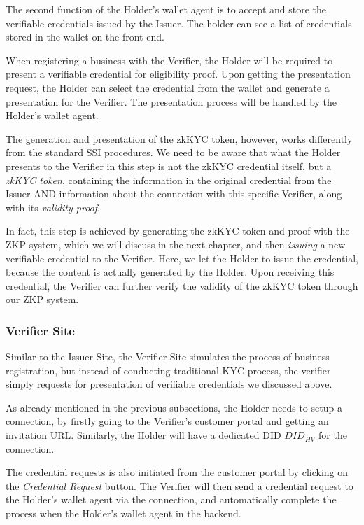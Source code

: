 \documentclass[
]{report}
\begin{document}
The second function of the Holder's wallet agent is to accept and store the
verifiable credentials issued by the Issuer. The holder can see a list of
credentials stored in the wallet on the front-end.

When registering a business with the Verifier, the Holder will be required
to present a verifiable credential for eligibility proof. Upon getting the
presentation request, the Holder can select the credential from the wallet
and generate a presentation for the Verifier. The presentation process will
be handled by the Holder's wallet agent.

The generation and presentation of the zkKYC token, however, works
differently from the standard SSI procedures. We need to be aware that
what the Holder presents to the Verifier in this step is not the zkKYC
credential itself, but a \emph{zkKYC token}, containing the information in
the original credential from the Issuer AND information about the connection
with this specific Verifier, along with its \emph{validity proof}.

In fact, this step is achieved by generating the zkKYC token and proof
with the ZKP system, which we will discuss in the next chapter, and then
\emph{issuing} a new verifiable credential to the Verifier. Here, we let
the Holder to issue the credential, because the content is actually
generated by the Holder. Upon receiving this credential, the Verifier
can further verify the validity of the zkKYC token through our ZKP system.

\subsubsection{Verifier Site}
Similar to the Issuer Site, the Verifier Site simulates the process of
business registration, but instead of conducting traditional KYC process,
the verifier simply requests for presentation of verifiable credentials
we discussed above.

As already mentioned in the previous subsections, the Holder needs to
setup a connection, by firstly going to the Verifier's customer portal and
getting an invitation URL. Similarly, the Holder will have a dedicated DID
$DID_{HV}$ for the connection.

The credential requests is also initiated from the customer portal by
clicking on the \emph{Credential Request} button. The Verifier will then
send a credential request to the Holder's wallet agent via the connection,
and automatically complete the process when the Holder's wallet agent in
the backend.
\end{document}
